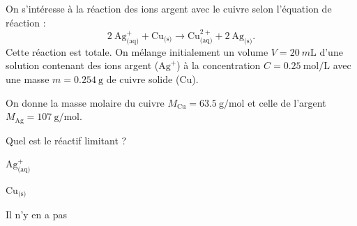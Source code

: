 
\finEntrainement








\hauteurLargeurCadreReponse		{6mm}{12mm}
\initialisationEntrainement

\debutEntrainement

On s'intéresse à la réaction des ions argent avec le cuivre selon l'équation de réaction : 
\[
2~\text{Ag}^+_\text{(aq)}+\text{Cu}_\text{(s)}\longrightarrow \text{Cu}^{2+}_\text{(aq)}+2~\text{Ag}_\text{(s)}.
\]
Cette réaction est totale. On mélange initialement un volume $V=\SI{20}{m\liter}$ d'une solution contenant des ions argent ($\text{Ag}^+$) à la concentration $C=\SI{0,25}{\mol\per\liter}$ avec une masse $m=\SI{0,254}{\gram}$ de cuivre solide ($\text{Cu}$). 

On donne la masse molaire du cuivre  $M_{\text{Cu}}= \SI{63,5}{\gram\per\mol}$ et celle de l'argent $M_{\text{Ag}}=\SI{107}{\gram\per\mol}$.


\begin{enonce}
Quel est le réactif limitant ?
\begin{listeQCM3Colonnes} %
	\item $\text{Ag}^+_\text{(aq)}$
	\item $\mathrm{Cu}_\text{(s)}$
	\item Il n'y en a pas
\end{listeQCM3Colonnes}
\end{enonce}

